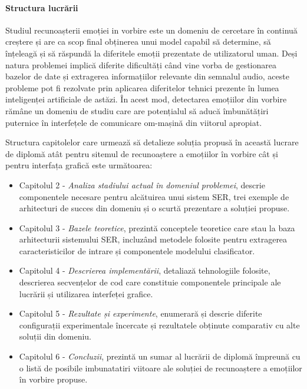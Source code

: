 \documentclass[a4paper,12pt]{book}
\begin{document}
					\paragraph{Structura lucrării}
					\hfill \par
					Studiul recunoașterii emoției in vorbire este un domeniu de cercetare în continuă creștere și are ca scop final obținerea unui model capabil să determine, să înțeleagă și să răspundă la diferitele emoții prezentate de utilizatorul uman. Deși natura problemei implică diferite dificultăți când vine vorba de gestionarea bazelor de date și extragerea informațiilor relevante din semnalul audio, aceste probleme pot fi rezolvate prin aplicarea diferitelor tehnici prezente în lumea inteligenței artificiale de astăzi. În acest mod, detectarea emoțiilor din vorbire rămâne un domeniu de studiu care are potențialul să aducă îmbunătățiri puternice în interfețele de comunicare om-mașină din viitorul apropiat. \par
					Structura capitolelor care urmează să detalieze soluția propusă în această lucrare de diplomă atât pentru sitemul de recunoaștere a emoțiilor în vorbire cât și pentru interfața grafică este următoarea:
					\begin{itemize}
						\item Capitolul 2 - \textit{Analiza stadiului actual în domeniul problemei}, descrie componentele necesare pentru alcătuirea unui sistem SER, trei exemple de arhitecturi de succes din domeniu și o scurtă prezentare a soluției propuse.
						\item Capitolul 3 - \textit{Bazele teoretice}, prezintă conceptele teoretice care stau la baza arhitecturii sistemului SER, incluzând metodele folosite pentru extragerea caracteristicilor de intrare și componentele modelului clasificator. 
						\item Capitolul 4 - \textit{Descrierea implementării}, detaliază tehnologiile folosite, descrierea secvențelor de cod care constituie componentele principale ale lucrării și utilizarea interfeței grafice.
						\item Capitolul 5 - \textit{Rezultate și experimente}, enumerară și descrie diferite configurații experimentale încercate și rezultatele obținute comparativ cu alte soluții din domeniu.
						\item Capitolul 6 - \textit{Concluzii}, prezintă un sumar al lucrării de diplomă împreună cu o listă de posibile imbunatatiri viitoare ale soluției de recunoaștere a emoțiilor în vorbire propuse.
					\end{itemize} 
					
\end{document}
